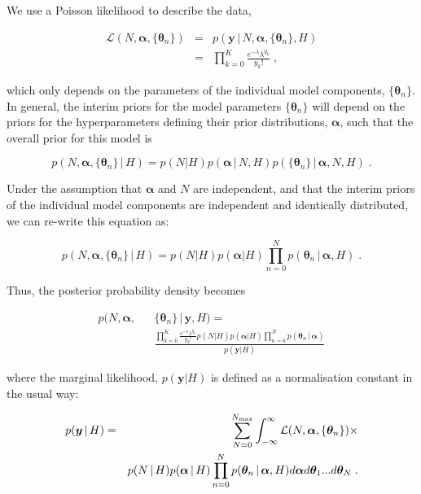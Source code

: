 \documentclass[12pt]{emulateapj}
\newcommand{\given}{\,|\,}
\newcommand{\counts}{y}
\newcommand{\likelihood}{{\mathcal L}}
\begin{document}
We use a Poisson likelihood to describe the data,

\begin{eqnarray}
\likelihood(N, \bm{\alpha}, \{\bm{\theta}_n \}) & = & p(\bm{\counts} \given N, \bm{\alpha}, \{\bm{\theta}_n \}, H) \\ \nonumber
 &= & \prod\limits_{k=0}^{K}{ \frac{e^{-\lambda} \lambda^{y_k} }{y_k! }} \; ,
\end{eqnarray}

which only depends on the parameters of the individual model components, $\{\bm{\theta}_n\}$. In general, the interim priors for the model 
parameters $\{\bm{\theta}_n\}$ will depend on the priors for the hyperparameters defining their prior distributions, $\bm{\alpha}$, such that the
overall prior for this model is

\begin{equation}
p(N, \bm{\alpha}, \{\bm{\theta}_n \} \given H) = p(N | H)p(\bm{\alpha}\given N, H)p(\{\bm{\theta}_n\}\given \bm{\alpha}, N, H) \; .
\end{equation}

Under the assumption that $\bm{\alpha}$ and $N$ are independent, and that the interim priors of the individual model components are
independent and identically distributed, we can re-write this equation as:

\begin{equation}
p(N, \bm{\alpha}, \{\bm{\theta}_n \} \given H) = p(N|H)p(\bm{\alpha}|H) \prod\limits_{n=0}^{N}  p(\bm{\theta}_n\given \bm{\alpha}, H) \; .
\end{equation}

Thus, the posterior probability density becomes

\begin{eqnarray}
p(N, \bm{\alpha}, &&\{\bm{\theta}_n \}  \given \bm{\counts}, H) = \\ 
&& \frac{\prod\limits_{k=0}^{K}{ \frac{e^{-\lambda} \lambda^{y_k} }{y_k! }} p(N|H)p(\bm{\alpha}|H) \prod\limits_{n=0}^{N}  p(\bm{\theta}_n\given \bm{\alpha})}{p(\bm{\counts} | H)}  \nonumber
\end{eqnarray}

where the marginal likelihood, $p(\bm{\counts} | H)$ is defined as a normalisation constant in the usual way: 

\begin{eqnarray}
p(\bm{\counts} \given H) & = & \sum_{N=0}^{N_{\rm max}} \int_{-\infty}^{\infty}{\likelihood(N, \bm{\alpha}, \{\bm{\theta}_n \})} \times \\ \nonumber
&& p(N\given H)p(\bm{\alpha} \given H) \prod\limits_{n=0}^{N}  p(\bm{\theta}_n\given \bm{\alpha}, H) d\bm{\alpha} d\bm{\theta}_1 ... d\bm{\theta}_N \; .
\label{eqn:marginal}
\end{eqnarray}
\end{document}
